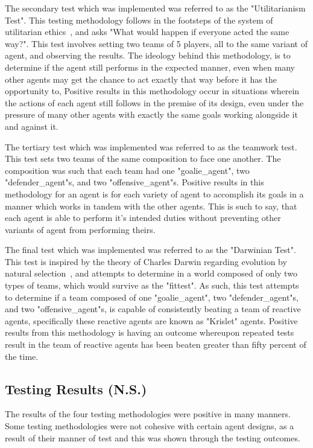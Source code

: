 \documentclass[conference]{IEEEtran}
\begin{document}
The secondary test which was implemented was referred to as the "Utilitarianism Test".
This testing methodology follows in the footsteps of the system of utilitarian ethics~\cite{b1}, and asks "What would happen if everyone acted the same way?".
This test involves setting two teams of 5 players, all to the same variant of agent, and observing the results.
The ideology behind this methodology, is to determine if the agent still performs in the expected manner, even when many other agents may get the chance to act exactly that way before it has the opportunity to,
Positive results in this methodology occur in situations wherein the actions of each agent still follows in the premise of its design, even under the pressure of many other agents with exactly the same goals working alongside it and against it.

The tertiary test which was implemented was referred to as the teamwork test.
This test sets two teams of the same composition to face one another.
The composition was such that each team had one "goalie\_agent", two "defender\_agent"s, and two "offensive\_agent"s.
Positive results in this methodology for an agent is for each variety of agent to accomplish its goals in a manner which works in tandem with the other agents.
This is such to say, that each agent is able to perform it's intended duties without preventing other variants of agent from performing theirs.

The final test which was implemented was referred to as the "Darwinian Test".
This test is inspired by the theory of Charles Darwin regarding evolution by natural selection~\cite{b2}, and attempts to determine in a world composed of only two types of teams, which would survive as the "fittest".
As such, this test attempts to determine if a team composed of one "goalie\_agent", two "defender\_agent"s, and two "offensive\_agent"s, is capable of consistently beating a team of reactive agents, specifically these reactive agents are known as "Krislet" agents.
Positive results from this methodology is having an outcome whereupon repeated tests result in the team of reactive agents has been beaten greater than fifty percent of the time.

\subsection{Testing Results (N.S.)}
The results of the four testing methodologies were positive in many manners.
Some testing methodologies were not cohesive with certain agent designs, as a result of their manner of test and this was shown through the testing outcomes.
\end{document}
